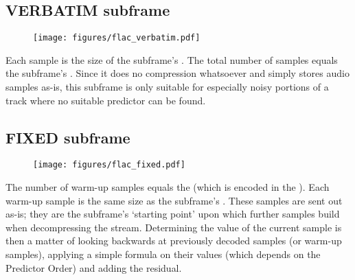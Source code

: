 \subsection{VERBATIM subframe}

\begin{figure}[h]
\texttt{[image: figures/flac\_verbatim.pdf]}
\end{figure}
\noindent
Each sample is the size of the subframe's .
The total number of samples equals the subframe's .
Since it does no compression whatsoever and simply stores
audio samples as-is, this subframe is only suitable for especially
noisy portions of a track where no suitable predictor can be found.

\subsection{FIXED subframe}

\begin{figure}[h]
\texttt{[image: figures/flac\_fixed.pdf]}
\end{figure}
\noindent
The number of warm-up samples equals the 
(which is encoded in the ).
Each warm-up sample is the same size as the subframe's
.
These samples are sent out as-is; they are the subframe's
`starting point' upon which further samples build when decompressing
the stream.
Determining the value of the current sample is then a matter of
looking backwards at previously decoded samples (or warm-up samples),
applying a simple formula on their values (which depends on the
Predictor Order) and adding the residual.

\clearpage

